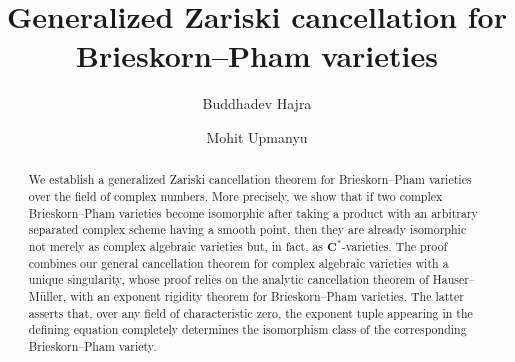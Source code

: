 \documentclass[english,10pt,reqno,twoside]{amsart}
\numberwithin{equation}{section}
\numberwithin{figure}{section}
\theoremstyle{plain}
\theoremstyle{plain}
\theoremstyle{definition}
\theoremstyle{plain}
\numberwithin{equation}{section}
\newcommand{\C}{\mathbf{C}}
\begin{document}
\title[Generalized Zariski cancellation for Brieskorn--Pham varieties]{Generalized Zariski cancellation for Brieskorn--Pham varieties}

\author[B. Hajra]{Buddhadev Hajra}
\address{Indian Statistical Institute, Kolkata, Stat-Math Unit, 203 B. T. Road, Baranagar, Kolkata - 700108, India}

\author[M. Upmanyu]{Mohit Upmanyu}
\address{Simion Stoilow Institute of Mathematics of the Romanian Academy, 21 Calea Grivitei Street, 010702 Bucharest, Romania}




\begin{abstract}
We establish a generalized Zariski cancellation theorem for Brieskorn--Pham varieties over the field of complex numbers. More precisely, we show that if two complex Brieskorn--Pham varieties become isomorphic after taking a product with an arbitrary separated complex scheme having a smooth point, then they are already isomorphic not merely as complex algebraic varieties but, in fact, as $\C^*$-varieties. The proof combines our general cancellation theorem for complex algebraic varieties with a unique singularity, whose proof relies on the analytic cancellation theorem of Hauser--M\"uller, with an exponent rigidity theorem for Brieskorn--Pham varieties. The latter asserts that, over any field of characteristic zero, the exponent tuple appearing in the defining equation completely determines the isomorphism class of the corresponding Brieskorn--Pham variety.
\end{abstract}

\maketitle

\tableofcontents
\end{document}
